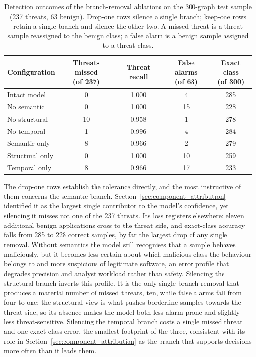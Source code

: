 \documentclass[%
    BCOR=10mm,
    DIV=13,
    toc=bibliography,
    toc=listof,
    oneside,
    12pt,
]{scrbook}
\begin{document}
\begin{table}[H]
\centering
\caption[Branch-removal ablation results]{Detection outcomes of the
branch-removal ablations on the 300-graph test sample (237 threats, 63
benign). Drop-one rows silence a single branch; keep-one rows retain a single
branch and silence the other two. A missed threat is a threat sample
reassigned to the benign class; a false alarm is a benign sample assigned to
a threat class.}
\label{tab:branch_removal}
\begin{tabular}{l c c c c}
\toprule
Configuration & \makecell[c]{Threats missed\\(of 237)} & Threat recall &
\makecell[c]{False alarms\\(of 63)} & \makecell[c]{Exact class\\(of 300)} \\
\midrule
Intact model      & 0  & 1.000 & 4  & 285 \\
\addlinespace
No semantic       & 0  & 1.000 & 15 & 228 \\
No structural     & 10 & 0.958 & 1  & 278 \\
No temporal       & 1  & 0.996 & 4  & 284 \\
\addlinespace
Semantic only     & 8  & 0.966 & 2  & 279 \\
Structural only   & 0  & 1.000 & 10 & 259 \\
Temporal only     & 8  & 0.966 & 17 & 233 \\
\bottomrule
\end{tabular}
\end{table}

The drop-one rows establish the tolerance directly, and the most instructive
of them concerns the semantic branch. Section~\ref{sec:component_attribution}
identified it as the largest single contributor to the model's confidence,
yet silencing it misses not one of the 237 threats. Its loss registers
elsewhere: eleven additional benign applications cross to the threat side,
and exact-class accuracy falls from 285 to 228 correct samples, by far the
largest drop of any single removal. Without semantics the model still
recognises that a sample behaves maliciously, but it becomes less certain
about which malicious class the behaviour belongs to and more suspicious of
legitimate software, an error profile that degrades precision and analyst
workload rather than safety. Silencing the structural branch inverts this
profile. It is the only single-branch removal that produces a material number
of missed threats, ten, while false alarms fall from four to one; the
structural view is what pushes borderline samples towards the threat side, so
its absence makes the model both less alarm-prone and slightly less
threat-sensitive. Silencing the temporal branch costs a single missed threat
and one exact-class error, the smallest footprint of the three, consistent
with its role in Section~\ref{sec:component_attribution} as the branch that
supports decisions more often than it leads them.
\end{document}
